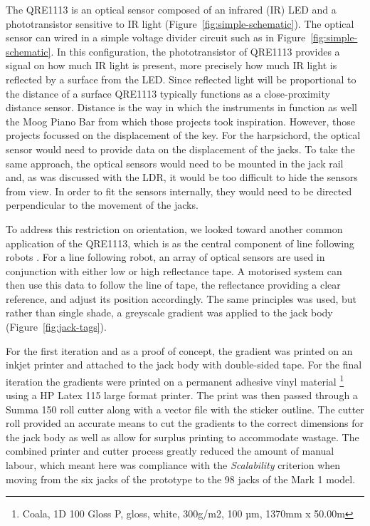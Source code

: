 The QRE1113 is an optical sensor composed of an infrared (IR) LED and a phototransistor sensitive to IR light (Figure~\ref{fig:simple-schematic}). The optical sensor can wired in a simple voltage divider circuit such as in Figure~\ref{fig:simple-schematic}. In this configuration,  the
phototransistor of QRE1113 provides a signal on how much IR light is present, more precisely how much IR light is reflected by a surface from the LED. Since reflected
light will be proportional to the distance of a surface QRE1113 typically functions as a
close-proximity distance sensor. Distance is the way in which the instruments
in \cite{mcpherson_portable_2013, moro_platform_2020} function as well the Moog Piano Bar from
which those projects took inspiration. However, those projects focussed on the displacement of the key. For the harpsichord, the optical sensor would need to provide data on the displacement of the jacks. To take the same approach, the optical sensors would need to be mounted in the jack rail and, as was discussed with the LDR, it would be too difficult to hide the sensors from view. In order to fit the sensors internally, they would need to be directed perpendicular to the movement of the jacks.

To address this restriction on orientation, we looked toward another common application of the QRE1113, which is as the central component of line following robots \cite{ramesh_turning_2017}. 
For a line following robot,
an array of optical sensors are used in conjunction with either low or high reflectance tape. A
motorised system can then use this data to follow the line of tape, the reflectance providing a clear reference, and adjust
its position accordingly. The same principles was used, but rather than single shade, a greyscale gradient was applied to the jack body (Figure~\ref{fig:jack-tags}).

For the first iteration and as a proof of concept, the gradient was printed on an inkjet printer and attached to the jack body with double-sided
tape. For the final iteration the gradients were printed on a permanent adhesive vinyl material
\footnote{Coala, 1D 100 Gloss P, gloss, white, 300g/m2, 100 µm, 1370mm x 50.00m} using a HP Latex 115 large format printer. The print was then passed through a Summa 150 roll
cutter along with a vector file with the sticker outline. The cutter roll provided an accurate means to cut the gradients to the correct dimensions for the jack body as well as allow for surplus printing to accommodate wastage. The combined printer and cutter process greatly reduced the amount of manual labour, which meant here was compliance with the \textit{Scalability} criterion when moving from the six jacks of the prototype to the 98 jacks of the Mark 1 model.

